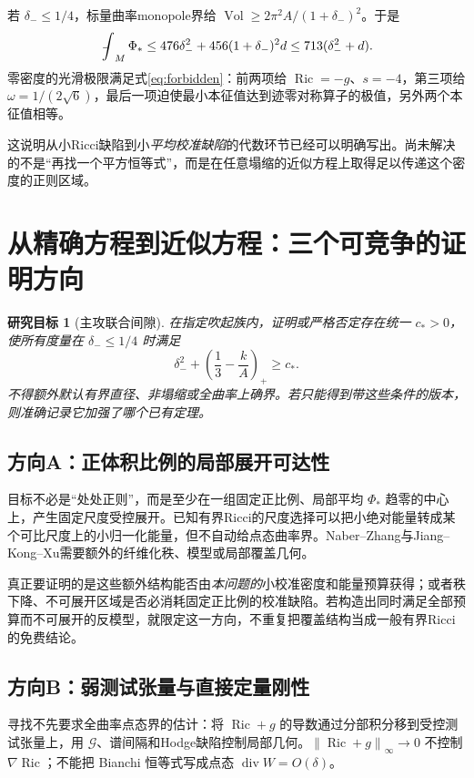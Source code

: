 \documentclass[UTF8,a4paper,11pt,fontset=fandol]{ctexart}
\numberwithin{equation}{section}
\newtheorem{target}[theorem]{研究目标}
\theoremstyle{definition}
\newcommand{\Ric}{\operatorname{Ric}}
\newcommand{\Vol}{\operatorname{Vol}}
\newcommand{\fint}{\mathop{\rlap{\,\raisebox{0.1ex}{\tiny$-$}}\int}\nolimits}
\newcommand{\norm}[1]{\left\lVert#1\right\rVert}
\begin{document}
若 $\delta_-\le1/4$，标量曲率monopole界给 $\Vol\ge2\pi^2A/(1+\delta_-)^2$。于是
\begin{equation}\label{eq:meanPhi}
\fint_M\Phi_*\le476\delta_-^2+456(1+\delta_-)^2d
\le713(\delta_-^2+d).
\end{equation}
零密度的光滑极限满足式\eqref{eq:forbidden}：前两项给 $\Ric=-g$、$s=-4$，第三项给 $\omega=1/(2\sqrt6)$，最后一项迫使最小本征值达到迹零对称算子的极值，另外两个本征值相等。

这说明从小Ricci缺陷到小\emph{平均校准缺陷}的代数环节已经可以明确写出。尚未解决的不是“再找一个平方恒等式”，而是在任意塌缩的近似方程上取得足以传递这个密度的正则区域。

\section{从精确方程到近似方程：三个可竞争的证明方向}
\begin{target}[主攻联合间隙]\label{tar:joint}
在指定吹起族内，证明或严格否定存在统一 $c_*>0$，使所有度量在 $\delta_-\le1/4$ 时满足
\begin{equation}\label{eq:joint}
\delta_-^2+\left(\frac13-\frac{k}{A}\right)_+\ge c_*.
\end{equation}
不得额外默认有界直径、非塌缩或全曲率上确界。若只能得到带这些条件的版本，则准确记录它加强了哪个已有定理。
\end{target}

\subsection{方向A：正体积比例的局部展开可达性}
目标不必是“处处正则”，而是至少在一组固定正比例、局部平均 $\Phi_*$ 趋零的中心上，产生固定尺度受控展开。已知有界Ricci的尺度选择\cite[Theorem 3.4]{GJ2017}可以把小绝对能量转成某个可比尺度上的小归一化能量，但不自动给点态曲率界。Naber--Zhang与Jiang--Kong--Xu需要额外的纤维化秩、模型或局部覆盖几何\cite{NZ,JKX}。

真正要证明的是这些额外结构能否由\emph{本问题的}小校准密度和能量预算获得；或者秩下降、不可展开区域是否必消耗固定正比例的校准缺陷。若构造出同时满足全部预算而不可展开的反模型，就限定这一方向，不重复把覆盖结构当成一般有界Ricci的免费结论。

\subsection{方向B：弱测试张量与直接定量刚性}
寻找不先要求全曲率点态界的估计：将 $\Ric+g$ 的导数通过分部积分移到受控测试张量上，用 $\mathcal G$、谱间隔和Hodge缺陷控制局部几何。$\norm{\Ric+g}_\infty\to0$ 不控制 $\nabla\Ric$；不能把 Bianchi 恒等式写成点态 $\operatorname{div}W=O(\delta)$。
\end{document}
